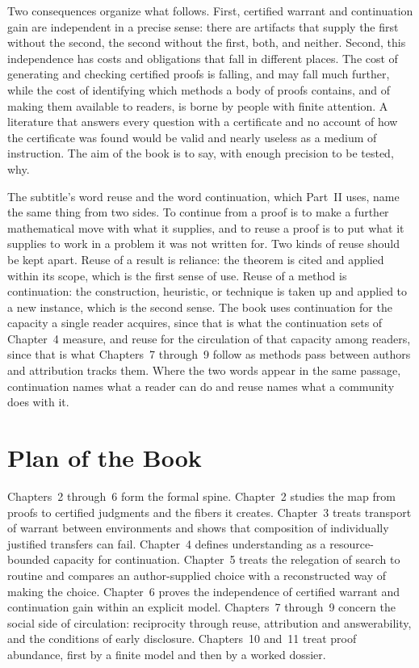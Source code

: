 \documentclass[11pt]{book}
\theoremstyle{definition}
\theoremstyle{remark}
\begin{document}
Two consequences organize what follows. First, certified warrant and continuation gain are independent in a precise sense: there are artifacts that supply the first without the second, the second without the first, both, and neither. Second, this independence has costs and obligations that fall in different places. The cost of generating and checking certified proofs is falling, and may fall much further, while the cost of identifying which methods a body of proofs contains, and of making them available to readers, is borne by people with finite attention. A literature that answers every question with a certificate and no account of how the certificate was found would be valid and nearly useless as a medium of instruction. The aim of the book is to say, with enough precision to be tested, why.

The subtitle's word reuse and the word continuation, which Part~II uses, name the same thing from two sides. To continue from a proof is to make a further mathematical move with what it supplies, and to reuse a proof is to put what it supplies to work in a problem it was not written for. Two kinds of reuse should be kept apart. Reuse of a result is reliance: the theorem is cited and applied within its scope, which is the first sense of use. Reuse of a method is continuation: the construction, heuristic, or technique is taken up and applied to a new instance, which is the second sense. The book uses continuation for the capacity a single reader acquires, since that is what the continuation sets of Chapter~4 measure, and reuse for the circulation of that capacity among readers, since that is what Chapters~7 through~9 follow as methods pass between authors and attribution tracks them. Where the two words appear in the same passage, continuation names what a reader can do and reuse names what a community does with it.

\section*{Plan of the Book}

Chapters~2 through~6 form the formal spine. Chapter~2 studies the map from proofs to certified judgments and the fibers it creates. Chapter~3 treats transport of warrant between environments and shows that composition of individually justified transfers can fail. Chapter~4 defines understanding as a resource-bounded capacity for continuation. Chapter~5 treats the relegation of search to routine and compares an author-supplied choice with a reconstructed way of making the choice. Chapter~6 proves the independence of certified warrant and continuation gain within an explicit model. Chapters~7 through~9 concern the social side of circulation: reciprocity through reuse, attribution and answerability, and the conditions of early disclosure. Chapters~10 and~11 treat proof abundance, first by a finite model and then by a worked dossier.
\end{document}
